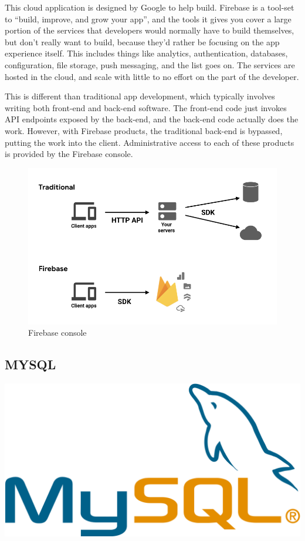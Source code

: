 \documentclass[a4paper,12pt]{report}
\begin{document}
This cloud application is designed by Google to help build. Firebase is a tool-set to “build, improve, and grow your app”, and the tools it gives you cover a large portion of the services that developers would normally have to build themselves, but don’t really want to build, because they’d rather be focusing on the app experience itself. This includes things like analytics, authentication, databases, configuration, file storage, push messaging, and the list goes on. The services are hosted in the cloud, and scale with little to no effort on the part of the developer.

This is different than traditional app development, which typically involves writing both front-end and back-end software. The front-end code just invokes API endpoints exposed by the back-end, and the back-end code actually does the work. However, with Firebase products, the traditional back-end is bypassed, putting the work into the client. Administrative access to each of these products is provided by the Firebase console.
\begin{figure}[h]
    \begin{center}
    \includegraphics[scale=.5]{images/firebaseDiagram.png}
    \caption{Firebase console}
    \label{fig:firbase}
    \end{center}
\end{figure}

\subsection{MYSQL}
\includegraphics[scale=.04]{images/mysql.png}
\end{document}
